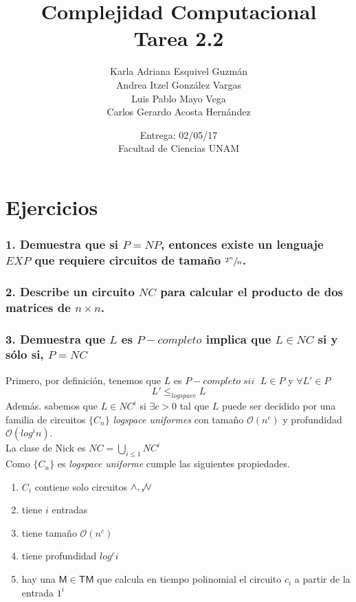 \documentclass[12pt]{article}
\title{Complejidad Computacional \\ Tarea 2.2}
\author{Karla Adriana Esquivel Guzmán \\ Andrea Itzel González Vargas\\ Luis Pablo Mayo Vega \\ Carlos Gerardo Acosta Hernández}
\date{Entrega: 02/05/17 \\ Facultad de Ciencias UNAM}
\begin{document}
\maketitle
\section*{Ejercicios}
\subsubsection*{1. Demuestra que si $P = NP$, entonces existe un lenguaje $EXP$ que requiere circuitos de tamaño $\sfrac{2^{n}}{n}$.} 
\subsubsection*{2. Describe un circuito $NC$ para calcular el producto de dos matrices de $n \times n$.}
\subsubsection*{3. Demuestra que $L$ es $P-completo$ implica que $L \in NC$ si y sólo si, $P=NC$ }
Primero, por definición, tenemos que $L$ es $P-completo \; sii \;$ $L \in P$ y $\forall L' \in P$ \[ L' \leq_{logspace} L \]
Además. sabemos que $L \in NC^i$ si $\exists c > 0$ tal que $L$ puede ser decidido por una familia de circuitos $\{C_n\}$ \textit{logspace uniformes} con tamaño $\mathcal{O}(n^c)$ y profundidad $\mathcal{O}(log^in)$.\\
La clase de Nick es $NC = \displaystyle\bigcup_{i \leq 1} NC^i$ \\
Como $\{C_n\}$ es \textit{logspace uniforme} cumple las siguientes propiedades.
\begin{enumerate}
\item $C_i$ contiene solo circuitos $\land, \not, \lor$
\item tiene $i$ entradas
\item tiene tamaño $\mathcal{O}(n^c)$
\item tiene profundidad $log^ci$
\item hay una $\mathsf{M \in TM}$ que calcula en tiempo polinomial el circuito $c_i$ a partir de la entrada $1^i$
\end{enumerate}
\end{document}
